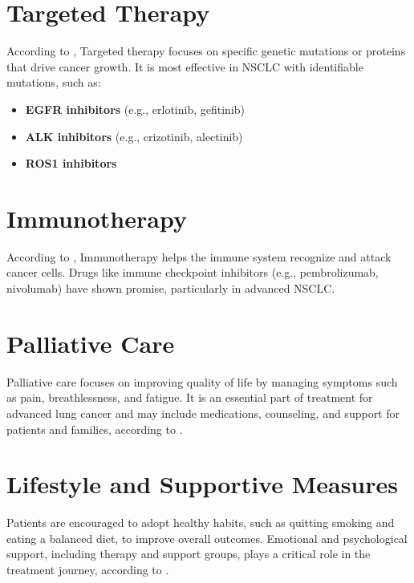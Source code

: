 \section{Targeted Therapy}
According to \cite{mayekar2017current}, Targeted therapy focuses on specific genetic mutations or proteins that drive cancer growth. It is most effective in NSCLC with identifiable mutations, such as: 
\begin{highlight}
\begin{itemize}
    \item \textbf{EGFR inhibitors} (e.g., erlotinib, gefitinib)
    \item \textbf{ALK inhibitors} (e.g., crizotinib, alectinib)
    \item \textbf{ROS1 inhibitors}
\end{itemize}
\end{highlight}

\section{Immunotherapy}
\begin{outline}
According to \cite{steven2016immunotherapy}, Immunotherapy helps the immune system recognize and attack cancer cells. Drugs like immune checkpoint inhibitors (e.g., pembrolizumab, nivolumab) have shown promise, particularly in advanced NSCLC.
\end{outline}

\section{Palliative Care}
\begin{outline}
Palliative care focuses on improving quality of life by managing symptoms such as pain, breathlessness, and fatigue. It is an essential part of treatment for advanced lung cancer and may include medications, counseling, and support for patients and families, according to \cite{ferrell2011palliative}.
\end{outline}

\section{Lifestyle and Supportive Measures}
\begin{outline}
Patients are encouraged to adopt healthy habits, such as quitting smoking and eating a balanced diet, to improve overall outcomes. Emotional and psychological support, including therapy and support groups, plays a critical role in the treatment journey, according to \cite{heredia2023effectiveness}.
\end{outline}

